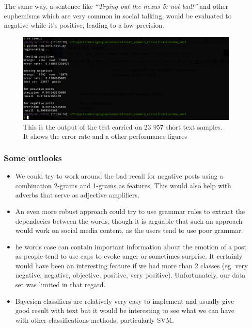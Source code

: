 The same way, a sentence like \textit{“Trying out the nexus 5: not bad!”} and other euphemisms which are very common in social talking, would be 
evaluated to negative while it’s positive, leading to a low precision.

\begin{figure}[h]
\centering
\includegraphics[scale=.4]{images/sent2.png}
\caption{This is the output of the test carried on 23 957 short text samples. It shows the error rate and a other performance figures}
\end{figure}



\subsubsection*{Some outlooks}
\begin{itemize}
 \item
 We could try to work around the bad recall for negative posts using a combination 2-grams and 1-grams as features. This would also help with adverbs that serve as adjective amplifiers.
\item
An even more robust approach could try to use grammar rules to extract the dependecies between the words, though it is arguable that such an approach would work on social media content, as the users tend to use poor grammar.
\item
he words case can contain important information about the emotion of a post as people tend to use caps to evoke anger or sometimes surprise. It certainly would have been an interesting feature if we had more than 2 classes (eg. very negative, negative, objective, positive, very positive). Unfortunately, our data set was limited in that regard.
\item
Bayesien classifiers are relatively very easy to implement and usually give good result with text but it would be interesting to see what we can have with other classifications methods, particularly SVM.

\end{itemize}

